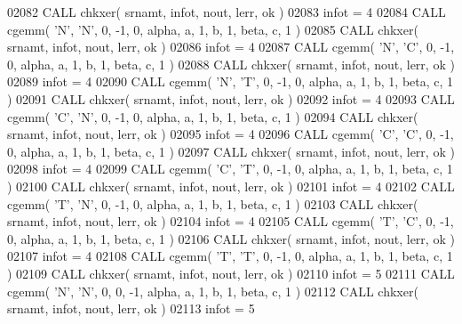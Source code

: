 \begin{DoxyCode}
02082       \textcolor{keyword}{CALL }chkxer( srnamt, infot, nout, lerr, ok )
02083       infot = 4
02084       \textcolor{keyword}{CALL }cgemm( \textcolor{stringliteral}{'N'}, \textcolor{stringliteral}{'N'}, 0, -1, 0, alpha, a, 1, b, 1, beta, c, 1 )
02085       \textcolor{keyword}{CALL }chkxer( srnamt, infot, nout, lerr, ok )
02086       infot = 4
02087       \textcolor{keyword}{CALL }cgemm( \textcolor{stringliteral}{'N'}, \textcolor{stringliteral}{'C'}, 0, -1, 0, alpha, a, 1, b, 1, beta, c, 1 )
02088       \textcolor{keyword}{CALL }chkxer( srnamt, infot, nout, lerr, ok )
02089       infot = 4
02090       \textcolor{keyword}{CALL }cgemm( \textcolor{stringliteral}{'N'}, \textcolor{stringliteral}{'T'}, 0, -1, 0, alpha, a, 1, b, 1, beta, c, 1 )
02091       \textcolor{keyword}{CALL }chkxer( srnamt, infot, nout, lerr, ok )
02092       infot = 4
02093       \textcolor{keyword}{CALL }cgemm( \textcolor{stringliteral}{'C'}, \textcolor{stringliteral}{'N'}, 0, -1, 0, alpha, a, 1, b, 1, beta, c, 1 )
02094       \textcolor{keyword}{CALL }chkxer( srnamt, infot, nout, lerr, ok )
02095       infot = 4
02096       \textcolor{keyword}{CALL }cgemm( \textcolor{stringliteral}{'C'}, \textcolor{stringliteral}{'C'}, 0, -1, 0, alpha, a, 1, b, 1, beta, c, 1 )
02097       \textcolor{keyword}{CALL }chkxer( srnamt, infot, nout, lerr, ok )
02098       infot = 4
02099       \textcolor{keyword}{CALL }cgemm( \textcolor{stringliteral}{'C'}, \textcolor{stringliteral}{'T'}, 0, -1, 0, alpha, a, 1, b, 1, beta, c, 1 )
02100       \textcolor{keyword}{CALL }chkxer( srnamt, infot, nout, lerr, ok )
02101       infot = 4
02102       \textcolor{keyword}{CALL }cgemm( \textcolor{stringliteral}{'T'}, \textcolor{stringliteral}{'N'}, 0, -1, 0, alpha, a, 1, b, 1, beta, c, 1 )
02103       \textcolor{keyword}{CALL }chkxer( srnamt, infot, nout, lerr, ok )
02104       infot = 4
02105       \textcolor{keyword}{CALL }cgemm( \textcolor{stringliteral}{'T'}, \textcolor{stringliteral}{'C'}, 0, -1, 0, alpha, a, 1, b, 1, beta, c, 1 )
02106       \textcolor{keyword}{CALL }chkxer( srnamt, infot, nout, lerr, ok )
02107       infot = 4
02108       \textcolor{keyword}{CALL }cgemm( \textcolor{stringliteral}{'T'}, \textcolor{stringliteral}{'T'}, 0, -1, 0, alpha, a, 1, b, 1, beta, c, 1 )
02109       \textcolor{keyword}{CALL }chkxer( srnamt, infot, nout, lerr, ok )
02110       infot = 5
02111       \textcolor{keyword}{CALL }cgemm( \textcolor{stringliteral}{'N'}, \textcolor{stringliteral}{'N'}, 0, 0, -1, alpha, a, 1, b, 1, beta, c, 1 )
02112       \textcolor{keyword}{CALL }chkxer( srnamt, infot, nout, lerr, ok )
02113       infot = 5

\end{DoxyCode}
